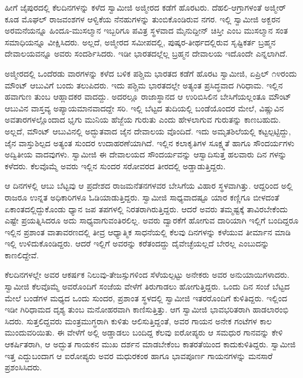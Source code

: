 ಹೀಗೆ ಜೈಪುರದಲ್ಲಿ ಕೆಲದಿನಗಳನ್ನು ಕಳೆದ ಸ್ವಾಮೀಜಿ ಅಜ್ಮೀರದ ಕಡೆಗೆ ಹೊರಟರು. ದೆಹಲಿ-ಆಗ್ರಾಗಳಂತೆ ಅಜ್ಮೀರ್ ಕೂಡ ಮೊಘಲ್ ರಾಜವಂಶಗಳ ಆಳ್ವಿಕೆಯ ನೆನಹುಗಳನ್ನು ತುಂಬಿಕೊಂಡಿರುವ ನಗರ. ಇಲ್ಲಿ ಸ್ವಾಮೀಜಿ ಅಕ್ಬರನ ಅರಮನೆಯನ್ನೂ ಹಿಂದೂ-ಮುಸಲ್ಮಾನ ಇಬ್ಬರಿಗೂ ಪವಿತ್ರ ಸ್ಥಳವಾದ ಮೈನುದ್ದೀನ್ ಚಿಸ್ತೀ ಎಂಬ ಮುಸಲ್ಮಾನ ಸಂತ ಸಮಾಧಿಯನ್ನೂ ವೀಕ್ಷಿಸಿದರು. ಅಲ್ಲದೆ, ಅಜ್ಮೀರದ ಸಮೀಪದಲ್ಲಿ, ಪುಷ್ಕರ-ತೀರ್ಥದಲ್ಲಿರುವ ಸೃಷ್ಟಿಕರ್ತ ಬ್ರಹ್ಮನ ದೇವಾಲಯವನ್ನೂ ಅವರು ಸಂದರ್ಶಿಸಿದರು. ಇಡೀ ಭಾರತದಲ್ಲೆಲ್ಲ ಬ್ರಹ್ಮನ ದೇವಾಲಯ ಇದೊಂದೇ ಎನ್ನಲಾಗಿದೆ.

ಅಜ್ಮೀರದಲ್ಲಿ ಒಂದೆರಡು ವಾರಗಳನ್ನು ಕಳೆದ ಬಳಿಕ ಪಶ್ಚಿಮ ಭಾರತದ ಕಡೆಗೆ ಹೊರಟ ಸ್ವಾಮೀಜಿ, ಏಪ್ರಿಲ್ ೧೪ರಂದು ಮೌಂಟ್ ಆಬುವಿಗೆ ಬಂದು ತಲುಪಿದರು. ಇದು ಪಶ್ಚಿಮ ಭಾರತದಲ್ಲೇ ಅತ್ಯಂತ ಪ್ರಸಿದ್ಧವಾದ ಗಿರಿಧಾಮ. ಇಲ್ಲಿನ ಹವಾಗುಣ ತುಂಬ ಆಹ್ಲಾದಕರ ವಾದದ್ದು. ಅದರಲ್ಲೂ ರಾಜಾಸ್ಥಾನದ ಆ ಉರಿಬಿಸಿಲಿನ ಬೇಸಿಗೆಯಲ್ಲಂತೂ ಮೌಂಟ್ ಆಬುವಿನ ವಾಸ್ತವ್ಯ ಅಪ್ಯಾಯಮಾನವಾದದ್ದೇ ಸರಿ. ಇಲ್ಲಿ ಬೆಟ್ಟದ ತುದಿಯಲ್ಲಿ ಬಂಡೆಯೊಂದರ ಮೇಲೆ, ವಿಷ್ಣುವಿನ ಅವತಾರಗಳಲ್ಲೊಂದಾದ ಭೃಗು ಮುನಿಯ ಹೆಜ್ಜೆಯ ಗುರುತು ಎಂದು ಹೇಳಲಾಗುವ ಗುರುತನ್ನು ಕಾಣಬಹುದು. ಅಲ್ಲದೆ, ಮೌಂಟ್ ಆಬುವಿನಲ್ಲಿ ಅದ್ಭುತವಾದ ಜೈನ ದೇವಾಲಯ ವೊಂದಿದೆ. ಇದು ಅಮೃತಶಿಲೆಯಲ್ಲಿ ಕಟ್ಟಲ್ಪಟ್ಟಿದ್ದು, ಜೈನ ವಾಸ್ತುಶಿಲ್ಪದ ಅತ್ಯಂತ ಸುಂದರ ಉದಾಹರಣೆಯಾಗಿದೆ. ಇಲ್ಲಿನ ಕಲಾಕೃತಿಗಳ ಸೂಕ್ಷ್ಮತೆ ಹಾಗೂ ಸೌಂದರ್ಯಗಳು ಅದ್ವಿತೀಯ ವಾದವುಗಳು. ಸ್ವಾಮೀಜಿ ಈ ದೇವಾಲಯದ ಸೌಂದರ್ಯವನ್ನು ಆಸ್ವಾದಿಸುತ್ತ ಹಲವಾರು ದಿನ ಗಳನ್ನು ಕಳೆದರು. ಕೆಲವೊಮ್ಮೆ ಅವರು ಇಲ್ಲಿನ ಸುಂದರ ಸರೋವರದ ತೀರದಲ್ಲಿ ಅಡ್ಡಾಡುತ್ತಿದ್ದರು.

ಆ ದಿನಗಳಲ್ಲಿ ಆಬು ಬೆಟ್ಟವು ಆ ಪ್ರದೇಶದ ರಾಜಮನೆತನಗಳವರ ಬೇಸಿಗೆಯ ವಿಹಾರ ಸ್ಥಳವಾಗಿತ್ತು. ಆದ್ದರಿಂದ ಅಲ್ಲಿ ರಾಜರೂ ಉನ್ನತ ಅಧಿಕಾರಿಗಳೂ ಓಡಿಯಾಡುತ್ತಿದ್ದರು. ಸ್ವಾಮೀಜಿ ಸಾಧ್ಯವಾದಷ್ಟೂ ಯಾರ ಕಣ್ಣಿಗೂ ಬೀಳದಂತೆ ಏಕಾಂತದಲ್ಲಿದ್ದುಕೊಂಡು ಧ್ಯಾನ ಜಪ ತಪಗಳಲ್ಲಿ ನಿರತರಾಗಿರುತ್ತಿದ್ದರು. ಆದರೆ ಅವರು ತಮ್ಮಷ್ಟಕ್ಕೆ ತಾವಿರಬೇಕೆಂದು ಎಷ್ಟೇ ಪ್ರಯತ್ನಿಸಿದರೂ ಅದು ಸಾಧ್ಯವಾಗುವಂತಿರಲಿಲ್ಲ. ಅವರು ದ್ವಾರಕೆಗೆ ಹೋಗುವ ದಾರಿಯಾಗಿ ಇಲ್ಲಿಗೆ ಬಂದಿದ್ದರೂ ಇಲ್ಲಿನ ಪ್ರಶಾಂತ ವಾತಾವರಣದಲ್ಲಿ ತೀವ್ರ ಆಧ್ಯಾತ್ಮಿಕ ಸಾಧನೆಯಲ್ಲಿ ಕೆಲವು ದಿನಗಳನ್ನು ಕಳೆಯುವ ತೀರ್ಮಾನ ಮಾಡಿ ಇಲ್ಲಿ ಉಳಿದುಕೊಂಡಿದ್ದರು. ಆದರೆ ಇಲ್ಲಿಗೆ ಅವರನ್ನು ಕರೆತಂದದ್ದು ದೈವೇಚ್ಛೆಯಲ್ಲದೆ ಬೇರಲ್ಲ ಎಂಬುದನ್ನು ಕಾಣಲಿದ್ದೇವೆ.

ಕೆಲದಿನಗಳಲ್ಲೇ ಅವರ ಆಕರ್ಷಕ ನಿಲುವು-ತೇಜಸ್ಸುಗಳಿಂದ ಸೆಳೆಯಲ್ಪಟ್ಟು ಅನೇಕರು ಅವರ ಅನುಯಾಯಿಗಳಾದರು. ಸ್ವಾಮೀಜಿ ಕೆಲವೊಮ್ಮೆ ಅವರೊಂದಿಗೆ ಸಂಜೆಯ ವೇಳೆಗೆ ತಿರುಗಾಡಲು ಹೋಗುತ್ತಿದ್ದರು. ಒಂದು ದಿನ ಸಂಜೆ ಬೆಟ್ಟದ ಮೇಲೆ ಬಂಡೆಗಳ ಮಧ್ಯದ ಒಂದು ಸುಂದರ, ಪ್ರಶಾಂತ ಸ್ಥಳದಲ್ಲಿ ಸ್ವಾಮೀಜಿ ಇತರರೊಂದಿಗೆ ಕುಳಿತಿದ್ದರು. ಇಲ್ಲಿಂದ ಇಡೀ ಗಿರಿಧಾಮದ ದೃಶ್ಯ ತುಂಬ ಮನೋಹರವಾಗಿ ಕಾಣಿಸುತ್ತಿತ್ತು. ಆಗ ಸ್ವಾಮೀಜಿ ಭಾವಭರಿತರಾಗಿ ಹಾಡಲಾರಂಭಿ ಸಿದರು. ಸುತ್ತಲಿದ್ದವರು ಮಂತ್ರಮುಗ್ಧರಾಗಿ ಕುಳಿತು ಆಲಿಸುತ್ತಿದ್ದಂತೆ, ಅವರ ಗಾಯನ ಅನೇಕ ಗಂಟೆಗಳ ಕಾಲ ಮುಂದುವರಿಯಿತು. ಈ ವೇಳೆಗೆ ಅಲ್ಲಿ ಅಡ್ಡಾಡಲು ಬಂದಿದ್ದ ಕೆಲವು ಐರೋಪ್ಯರು ಆ ಸಮಧುರ ಗಾನವನ್ನು ಕೇಳಿ ಆಕರ್ಷಿತರಾಗಿ, ಆ ಅದ್ಭುತ ಗಾಯಕನ ಮುಖ ದರ್ಶನ ಮಾಡಬೇಕೆಂಬ ಕಾತರತೆಯಿಂದ ಕಾದುಕುಳಿತಿದ್ದರು. ಸ್ವಾಮೀಜಿ ಇತ್ತ ಎದ್ದುಬಂದಾಗ ಆ ಐರೋಪ್ಯರು ಅವರ ಮಧುರಕಂಠ ಹಾಗೂ ಭಾವಪೂರ್ಣ ಗಾಯನಗಳನ್ನು ಮನಸಾರೆ ಪ್ರಶಂಸಿಸಿದರು.

